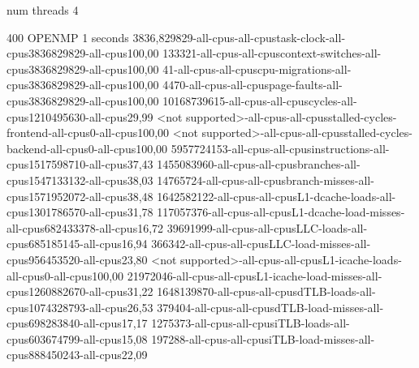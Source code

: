 num threads 4

400
OPENMP
1 seconds
3836,829829-all-cpus-all-cpustask-clock-all-cpus3836829829-all-cpus100,00
133321-all-cpus-all-cpuscontext-switches-all-cpus3836829829-all-cpus100,00
41-all-cpus-all-cpuscpu-migrations-all-cpus3836829829-all-cpus100,00
4470-all-cpus-all-cpuspage-faults-all-cpus3836829829-all-cpus100,00
10168739615-all-cpus-all-cpuscycles-all-cpus1210495630-all-cpus29,99
<not supported>-all-cpus-all-cpusstalled-cycles-frontend-all-cpus0-all-cpus100,00
<not supported>-all-cpus-all-cpusstalled-cycles-backend-all-cpus0-all-cpus100,00
5957724153-all-cpus-all-cpusinstructions-all-cpus1517598710-all-cpus37,43
1455083960-all-cpus-all-cpusbranches-all-cpus1547133132-all-cpus38,03
14765724-all-cpus-all-cpusbranch-misses-all-cpus1571952072-all-cpus38,48
1642582122-all-cpus-all-cpusL1-dcache-loads-all-cpus1301786570-all-cpus31,78
117057376-all-cpus-all-cpusL1-dcache-load-misses-all-cpus682433378-all-cpus16,72
39691999-all-cpus-all-cpusLLC-loads-all-cpus685185145-all-cpus16,94
366342-all-cpus-all-cpusLLC-load-misses-all-cpus956453520-all-cpus23,80
<not supported>-all-cpus-all-cpusL1-icache-loads-all-cpus0-all-cpus100,00
21972046-all-cpus-all-cpusL1-icache-load-misses-all-cpus1260882670-all-cpus31,22
1648139870-all-cpus-all-cpusdTLB-loads-all-cpus1074328793-all-cpus26,53
379404-all-cpus-all-cpusdTLB-load-misses-all-cpus698283840-all-cpus17,17
1275373-all-cpus-all-cpusiTLB-loads-all-cpus603674799-all-cpus15,08
197288-all-cpus-all-cpusiTLB-load-misses-all-cpus888450243-all-cpus22,09
